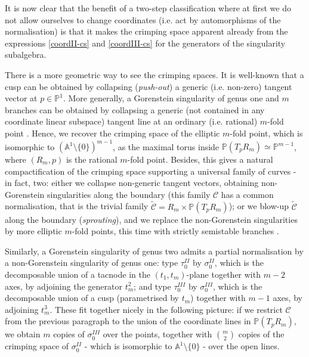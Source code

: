 \documentclass[11pt]{amsart}
\newcommand{\PP}{\mathbb P}
\newcommand{\Aaff}{\mathbb A}
\theoremstyle{plain}
\theoremstyle{definition}
\begin{document}
It is now clear that the benefit of a two-step classification where at first we do not allow ourselves to change coordinates (i.e. act by automorphisms of the normalisation) is that it makes the crimping space apparent already from the expressions \eqref{coordII-cs} and \eqref{coordIII-cs} for the generators of the singularity subalgebra.

There is a more geometric way to see the crimping spaces. It is well-known that a cusp can be obtained by collapsing (\emph{push-out}) a generic (i.e. non-zero) tangent vector at $p\in\PP^1$. More generally, a Gorenstein singularity of genus one and $m$ branches can be obtained by collapsing a generic (not contained in any coordinate linear subspace) tangent line at an ordinary (i.e. rational) $m$-fold point \cite[Lemma 2.2]{SMY1}. Hence, we recover the crimping space of the elliptic $m$-fold point, which is isomorphic to $(\Aaff^1\setminus\{0\})^{m-1}$, as the maximal torus inside $\PP(T_pR_m)\simeq\PP^{m-1}$, where $(R_m,p)$ is the rational $m$-fold point. Besides, this gives a natural compactification of the crimping space supporting a universal family of curves - in fact, two: either we collapse non-generic tangent vectors, obtaining non-Gorenstein singularities along the boundary (this family $\mathcal C$ has a common normalisation, that is the trivial family $\widetilde{\mathcal C}=R_m\times \PP(T_pR_m)$); or we blow-up $\widetilde{\mathcal C}$ along the boundary (\emph{sprouting}), and we replace the non-Gorenstein singularities by more elliptic $m$-fold points, this time with strictly semistable branches \cite[\S 2.2-3]{SMY2}.

Similarly, a Gorenstein singularity of genus two admits a partial normalisation by a non-Gorenstein singularity of genus one: type $\tau_0^{II}$ by $\sigma_0^{II}$, which is the decomposable union of a tacnode in the $(t_1,t_m)$-plane together with $m-2$ axes, by adjoining the generator $t_m^2$; and type $\tau_0^{III}$ by $\sigma_0^{III}$, which is the decomposable union of a cusp (parametrised by $t_m$) together with $m-1$ axes, by adjoining $t_m^3$. These fit together nicely in the following picture: if we restrict $\mathcal C$ from the previous paragraph to the union of the coordinate lines in $\PP(T_pR_m)$, we obtain $m$ copies of $\sigma_0^{III}$ over the points, together with $\binom{m}{2}$ copies of the crimping space of $\sigma_0^{II}$ - which is isomorphic to $\Aaff^1\setminus\{0\}$ - over the open lines.
\end{document}
